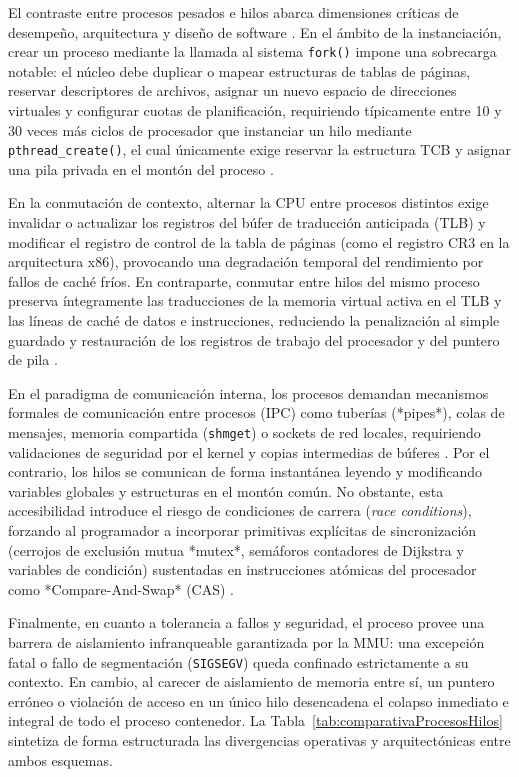 \documentclass[12pt]{article}
\begin{document}
El contraste entre procesos pesados e hilos abarca dimensiones críticas de desempeño, arquitectura y diseño de software \parencite[\S 4.1, p.\ 179]{stallings2018operating}. En el ámbito de la instanciación, crear un proceso mediante la llamada al sistema \texttt{fork()} impone una sobrecarga notable: el núcleo debe duplicar o mapear estructuras de tablas de páginas, reservar descriptores de archivos, asignar un nuevo espacio de direcciones virtuales y configurar cuotas de planificación, requiriendo típicamente entre 10 y 30 veces más ciclos de procesador que instanciar un hilo mediante \texttt{pthread\_create()}, el cual únicamente exige reservar la estructura TCB y asignar una pila privada en el montón del proceso \parencite[\S 4.1, p.\ 179]{stallings2018operating}.

En la conmutación de contexto, alternar la CPU entre procesos distintos exige invalidar o actualizar los registros del búfer de traducción anticipada (TLB) y modificar el registro de control de la tabla de páginas (como el registro CR3 en la arquitectura x86), provocando una degradación temporal del rendimiento por fallos de caché fríos. En contraparte, conmutar entre hilos del mismo proceso preserva íntegramente las traducciones de la memoria virtual activa en el TLB y las líneas de caché de datos e instrucciones, reduciendo la penalización al simple guardado y restauración de los registros de trabajo del procesador y del puntero de pila \parencite[\S 3.5.1, p.\ 119]{carretero2001sistemas}.

En el paradigma de comunicación interna, los procesos demandan mecanismos formales de comunicación entre procesos (IPC) como tuberías (*pipes*), colas de mensajes, memoria compartida (\texttt{shmget}) o sockets de red locales, requiriendo validaciones de seguridad por el kernel y copias intermedias de búferes \parencite[\S 3.4, pp.\ 86--90]{silberschatz2006fundamentos}. Por el contrario, los hilos se comunican de forma instantánea leyendo y modificando variables globales y estructuras en el montón común. No obstante, esta accesibilidad introduce el riesgo de condiciones de carrera (\textit{race conditions}), forzando al programador a incorporar primitivas explícitas de sincronización (cerrojos de exclusión mutua *mutex*, semáforos contadores de Dijkstra y variables de condición) sustentadas en instrucciones atómicas del procesador como *Compare-And-Swap* (CAS) \parencite[\S 4.1, p.\ 112]{silberschatz2006fundamentos}.

Finalmente, en cuanto a tolerancia a fallos y seguridad, el proceso provee una barrera de aislamiento infranqueable garantizada por la MMU: una excepción fatal o fallo de segmentación (\texttt{SIGSEGV}) queda confinado estrictamente a su contexto. En cambio, al carecer de aislamiento de memoria entre sí, un puntero erróneo o violación de acceso en un único hilo desencadena el colapso inmediato e integral de todo el proceso contenedor. La Tabla~\ref{tab:comparativaProcesosHilos} sintetiza de forma estructurada las divergencias operativas y arquitectónicas entre ambos esquemas.
\end{document}

